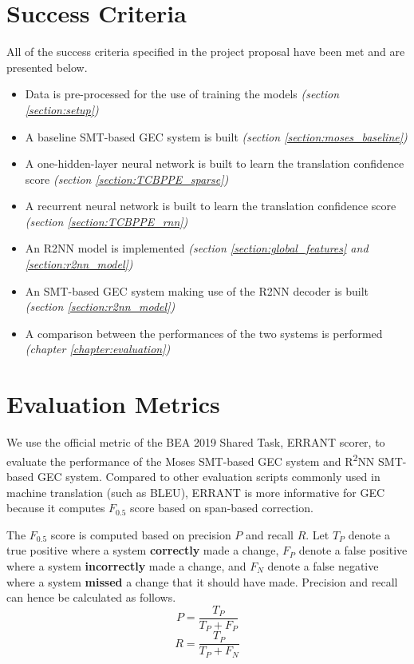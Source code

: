 \documentclass[12pt,a4paper,twoside,openright]{report}
\begin{document}
\section{Success Criteria}\label{section:success_criteria}
All of the success criteria specified in the project proposal have been met and are presented below.
\begin{itemize}
    \item[\checkmark] Data is pre-processed for the use of training the models \textit{(section \ref{section:setup})}
    \item[\checkmark] A baseline SMT-based GEC system is built \textit{(section \ref{section:moses_baseline})}
    \item[\checkmark] A one-hidden-layer neural network is built to learn the translation confidence score \textit{(section \ref{section:TCBPPE_sparse})}
    \item[\checkmark] A recurrent neural network is built to learn the translation confidence score \textit{(section \ref{section:TCBPPE_rnn})}
    \item[\checkmark] An R2NN model is implemented \textit{(section \ref{section:global_features} and \ref{section:r2nn_model})}
    \item[\checkmark] An SMT-based GEC system making use of the R2NN decoder is built \textit{(section \ref{section:r2nn_model})}
    \item[\checkmark] A comparison between the performances of the two systems is performed \textit{(chapter \ref{chapter:evaluation})}
\end{itemize}

\section{Evaluation Metrics}
We use the official metric of the BEA 2019 Shared Task\cite{bryant-etal-2019-bea}, ERRANT scorer\cite{bryant-etal-2017-automatic}\cite{felice-etal-2016-automatic}, to evaluate the performance of the Moses SMT-based GEC system and R\textsuperscript{2}NN SMT-based GEC system. Compared to other evaluation scripts commonly used in machine translation (such as BLEU\cite{10.3115/1073083.1073135}), ERRANT is more informative for GEC because it computes $F_{0.5}$ score based on span-based correction.

The $F_{0.5}$ score is computed based on precision $P$ and recall $R$. Let $T_P$ denote a true positive where a system \textbf{correctly} made a change, $F_P$ denote a false positive where a system \textbf{incorrectly} made a change, and $F_N$ denote a false negative where a system \textbf{missed} a change that it should have made. Precision and recall can hence be calculated as follows.
\[P = \frac{T_P}{T_P+F_P}\]
\[R = \frac{T_P}{T_P+F_N}\]
\end{document}
